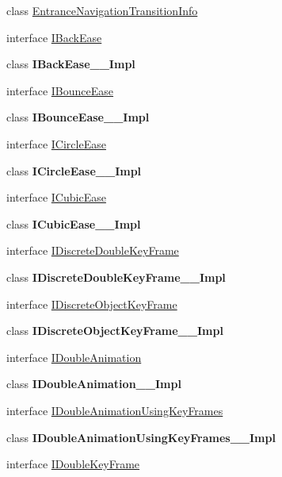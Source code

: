 \begin{DoxyCompactItemize}
\item 
class \hyperlink{class_windows_1_1_u_i_1_1_xaml_1_1_media_1_1_animation_1_1_entrance_navigation_transition_info}{Entrance\+Navigation\+Transition\+Info}
\item 
interface \hyperlink{interface_windows_1_1_u_i_1_1_xaml_1_1_media_1_1_animation_1_1_i_back_ease}{I\+Back\+Ease}
\item 
class {\bfseries I\+Back\+Ease\+\_\+\+\_\+\+Impl}
\item 
interface \hyperlink{interface_windows_1_1_u_i_1_1_xaml_1_1_media_1_1_animation_1_1_i_bounce_ease}{I\+Bounce\+Ease}
\item 
class {\bfseries I\+Bounce\+Ease\+\_\+\+\_\+\+Impl}
\item 
interface \hyperlink{interface_windows_1_1_u_i_1_1_xaml_1_1_media_1_1_animation_1_1_i_circle_ease}{I\+Circle\+Ease}
\item 
class {\bfseries I\+Circle\+Ease\+\_\+\+\_\+\+Impl}
\item 
interface \hyperlink{interface_windows_1_1_u_i_1_1_xaml_1_1_media_1_1_animation_1_1_i_cubic_ease}{I\+Cubic\+Ease}
\item 
class {\bfseries I\+Cubic\+Ease\+\_\+\+\_\+\+Impl}
\item 
interface \hyperlink{interface_windows_1_1_u_i_1_1_xaml_1_1_media_1_1_animation_1_1_i_discrete_double_key_frame}{I\+Discrete\+Double\+Key\+Frame}
\item 
class {\bfseries I\+Discrete\+Double\+Key\+Frame\+\_\+\+\_\+\+Impl}
\item 
interface \hyperlink{interface_windows_1_1_u_i_1_1_xaml_1_1_media_1_1_animation_1_1_i_discrete_object_key_frame}{I\+Discrete\+Object\+Key\+Frame}
\item 
class {\bfseries I\+Discrete\+Object\+Key\+Frame\+\_\+\+\_\+\+Impl}
\item 
interface \hyperlink{interface_windows_1_1_u_i_1_1_xaml_1_1_media_1_1_animation_1_1_i_double_animation}{I\+Double\+Animation}
\item 
class {\bfseries I\+Double\+Animation\+\_\+\+\_\+\+Impl}
\item 
interface \hyperlink{interface_windows_1_1_u_i_1_1_xaml_1_1_media_1_1_animation_1_1_i_double_animation_using_key_frames}{I\+Double\+Animation\+Using\+Key\+Frames}
\item 
class {\bfseries I\+Double\+Animation\+Using\+Key\+Frames\+\_\+\+\_\+\+Impl}
\item 
interface \hyperlink{interface_windows_1_1_u_i_1_1_xaml_1_1_media_1_1_animation_1_1_i_double_key_frame}{I\+Double\+Key\+Frame}

\end{DoxyCompactItemize}
